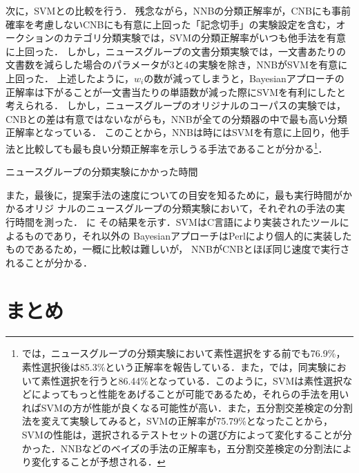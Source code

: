 \documentclass[japanese]{jnlp_1.4}
\newcommand{\tabref}[1]{}
\begin{document}
次に，SVMとの比較を行う．
残念ながら，NNBの分類正解率が，CNBにも事前確率を考慮しないCNBにも有意に上回った「記念切手」の実験設定を含む，オークションのカテゴリ分類実験では，SVMの分類正解率がいつも他手法を有意に上回った．
しかし，ニュースグループの文書分類実験では，一文書あたりの文書数を減らした場合のパラメータが3と4の実験を除き，NNBがSVMを有意に上回った．
上述したように，$w_i$の数が減ってしまうと，Bayesianアプローチの正解率は下がることが一文書当たりの単語数が減った際にSVMを有利にしたと考えられる．
しかし，ニュースグループのオリジナルのコーパスの実験では，CNBとの差は有意ではないながらも，NNBが全ての分類器の中で最も高い分類正解率となっている．
このことから，NNBは時にはSVMを有意に上回り，他手法と比較しても最も良い分類正解率を示しうる手法であることが分かる\footnote{では，ニュースグループの分類実験において素性選択をする前でも76.9\%，素性選択後は85.3\%という正解率を報告している．また，では，同実験において素性選択を行うと86.44\%となっている．このように，SVMは素性選択などによってもっと性能をあげることが可能であるため，それらの手法を用いればSVMの方が性能が良くなる可能性が高い．また，五分割交差検定の分割法を変えて実験してみると，SVMの正解率が75.79\%となったことから，SVMの性能は，選択されるテストセットの選び方によって変化することが分かった．NNBなどのベイズの手法の正解率も，五分割交差検定の分割法により変化することが予想される．}．

\begin{table}[t]
\caption{ニュースグループの分類実験にかかった時間}
\label{Tab:ニュースグループの分類実験にかかった時間}

\end{table}

また，最後に，提案手法の速度についての目安を知るために，最も実行時間がかかるオリジ
ナルのニュースグループの分類実験において，それぞれの手法の実行時間を測った．
\tabref{Tab:ニュースグループの分類実験にかかった時間}に
その結果を示す．SVMはC言語により実装されたツールによるものであり，それ以外の
BayesianアプローチはPerlにより個人的に実装したものであるため，一概に比較は難しいが，
NNBがCNBとほぼ同じ速度で実行されることが分かる．



\section{まとめ} \label{Sec:まとめ}
\end{document}
